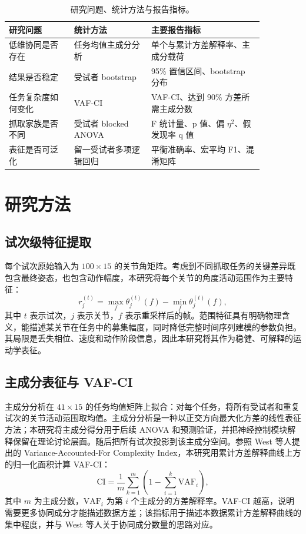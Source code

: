 \documentclass[10pt,a4paper]{ctexart}
\begin{document}
\begin{table}[H]
\centering
\caption{研究问题、统计方法与报告指标。}
\label{tab:analysisplan}
\small
\begin{tabular}{p{0.22\linewidth}p{0.26\linewidth}p{0.38\linewidth}}
\toprule
研究问题 & 统计方法 & 主要报告指标 \\
\midrule
低维协同是否存在 & 任务均值主成分分析 & 单个与累计方差解释率、主成分载荷 \\
结果是否稳定 & 受试者 bootstrap & 95\% 置信区间、bootstrap 分布 \\
任务复杂度如何变化 & VAF-CI & VAF-CI、达到 90\% 方差所需主成分数 \\
抓取家族是否不同 & 受试者 blocked ANOVA & F 统计量、p 值、偏 $\eta^2$、假发现率 q 值 \\
表征是否可泛化 & 留一受试者多项逻辑回归 & 平衡准确率、宏平均 F1、混淆矩阵 \\
\bottomrule
\end{tabular}
\end{table}

\section{研究方法}
\subsection{试次级特征提取}
每个试次原始输入为 $100 \times 15$ 的关节角矩阵。考虑到不同抓取任务的关键差异既包含最终姿态，也包含动作幅度，本研究将每个关节的角度活动范围作为主要特征：
\begin{equation}
r_j^{(t)}=\max_f \theta_j^{(t)}(f)-\min_f \theta_j^{(t)}(f),
\end{equation}
其中 $t$ 表示试次，$j$ 表示关节，$f$ 表示重采样后的帧。范围特征具有明确物理含义，能描述某关节在任务中的募集幅度，同时降低完整时间序列建模的参数负担。其局限是丢失相位、速度和动作阶段信息，因此本研究将其作为稳健、可解释的运动学表征。

\subsection{主成分表征与 VAF-CI}
主成分分析在 $41 \times 15$ 的任务均值矩阵上拟合：对每个任务，将所有受试者和重复试次的关节活动范围取均值。主成分分析是一种以正交方向最大化方差的线性表征方法；本研究将主成分得分用于后续 ANOVA 和预测验证，并把神经控制模块解释保留在理论讨论层面\cite{jolliffe2016}。随后把所有试次投影到该主成分空间。参照 West 等人提出的 Variance-Accounted-For Complexity Index，本研究用累计方差解释曲线上方的归一化面积计算 VAF-CI：
\begin{equation}
\mathrm{CI} = \frac{1}{m}\sum_{k=1}^m \left(1-\sum_{i=1}^k \mathrm{VAF}_i\right),
\end{equation}
其中 $m$ 为主成分数，$\mathrm{VAF}_i$ 为第 $i$ 个主成分的方差解释率。VAF-CI 越高，说明需要更多协同成分才能描述数据方差；该指标用于描述本数据累计方差解释曲线的集中程度，并与 West 等人关于协同成分数量的思路对应。
\end{document}
